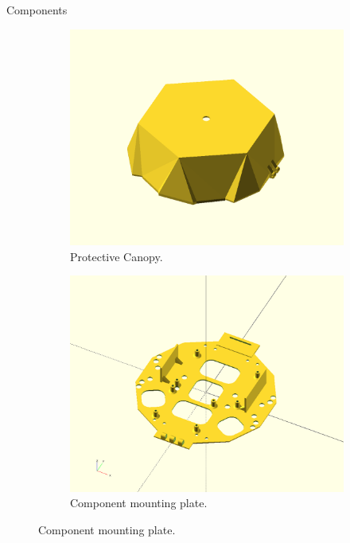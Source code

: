 \documentclass[final, 20pt]{beamer}
\newlength{\colwidth}
\begin{document}
\begin{frame}[t]
\begin{columns}[t]
\begin{column}{\colwidth}
\begin{alertblock}{Components}

    \begin{figure}
      \centering
      \begin{subfigure}[b]{0.33\textwidth}
        \includegraphics[width=\textwidth]{canopy.png}
        \caption*{Protective Canopy.}
      \end{subfigure}
      \hspace{1cm}
      \begin{subfigure}[b]{0.33\textwidth}
        \includegraphics[width=\textwidth]{component_mounting_plate.png}
        \caption*{Component mounting plate.}
      \end{subfigure}


\end{figure}
\end{alertblock}
\end{column}
\end{columns}
\end{frame}
\end{document}
